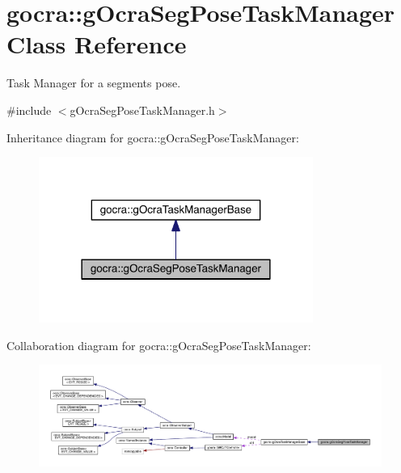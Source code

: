 \hypertarget{classgocra_1_1gOcraSegPoseTaskManager}{}\section{gocra\+:\+:g\+Ocra\+Seg\+Pose\+Task\+Manager Class Reference}
\label{classgocra_1_1gOcraSegPoseTaskManager}


Task Manager for a segment\textquotesingle{}s pose.  




{\ttfamily \#include $<$g\+Ocra\+Seg\+Pose\+Task\+Manager.\+h$>$}



Inheritance diagram for gocra\+:\+:g\+Ocra\+Seg\+Pose\+Task\+Manager\+:\nopagebreak
\begin{figure}[H]
\begin{center}
\leavevmode
\includegraphics[width=254pt]{da/df2/classgocra_1_1gOcraSegPoseTaskManager__inherit__graph}
\end{center}
\end{figure}


Collaboration diagram for gocra\+:\+:g\+Ocra\+Seg\+Pose\+Task\+Manager\+:
\nopagebreak
\begin{figure}[H]
\begin{center}
\leavevmode
\includegraphics[width=350pt]{d2/ddc/classgocra_1_1gOcraSegPoseTaskManager__coll__graph}
\end{center}
\end{figure}
